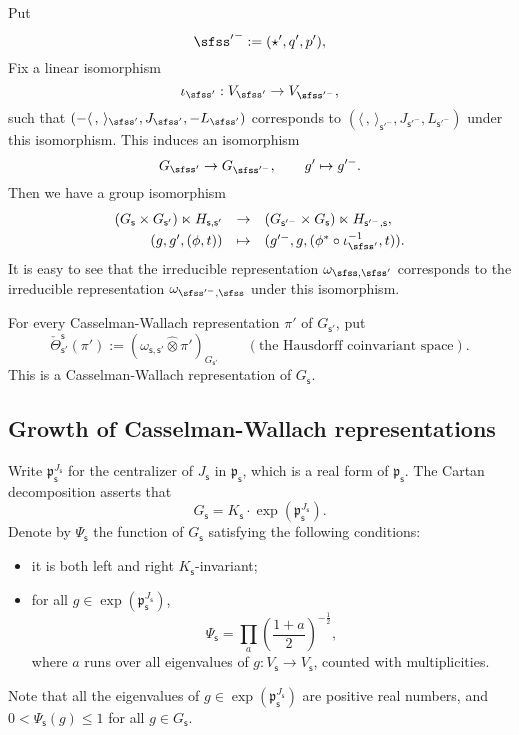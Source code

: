 \documentclass[12pt,a4paper]{amsart}
\newcommand{\p}{\mathfrak p}
\newcommand{\la}{\langle}
\newcommand{\ra}{\rangle}
\newcommand{\be}{\begin {equation}}
\newcommand{\ee}{\end {equation}}
\numberwithin{equation}{section}
\theoremstyle{remark}
\begin{document}
Put
\[%
   {\sfss'}^-:=(\star', q', p'),
\]
Fix a linear isomorphism
\be\label{iota0}
 \iota_{\sfss'}:  V_{\sfss'}\rightarrow V_{\sfss'^-}, %
\ee
such that $(-\la\,,\,\ra_{\sfss'}, J_{\sfss'},-L_{\sfss'})$ corresponds to   $(\la\,,\,\ra_{\mathsf s'^-}, J_{\mathsf s'^-}, L_{\mathsf s'^-})$ under this isomorphism.
This induces an isomorphism
\be\label{isoggp}
  G_{\sfss'}\rightarrow G_{\sfss'^-}, \qquad g'\mapsto g'^-.
\ee
Then we have a group isomorphism
\be\label{identifyjg}
\begin{array}{rcl}
  (G_{\mathsf s}\times G_{\mathsf s'})\ltimes H_{\mathsf s, \mathsf s'}&\rightarrow& (G_{\mathsf s'^-}\times G_{\mathsf s})\ltimes H_{\mathsf s'^-, \mathsf s},\smallskip\\
   (g, g', (\phi, t))&\mapsto & (g'^-, g, (\phi^*  \circ \iota_{\sfss'}^{-1}, t)).
   \end{array}
\ee
It is easy to see that the irreducible representation $\omega_{\sfss, \sfss'}$ corresponds to the irreducible representation $\omega_{\sfss'^-, \sfss}$ under this isomorphism.


 For every Casselman-Wallach representation $\pi'$ of $G_{\mathsf s'}$,
put
\[
   \check \Theta_{\mathsf s'}^{\mathsf s}(\pi'):=(\omega_{\mathsf s, \mathsf s'}\widehat \otimes \pi')_{G_{\mathsf s'}} \qquad (\textrm{the  Hausdorff coinvariant space}).
\]
This is a Casselman-Wallach representation of $G_{\mathsf s}$.



\subsection{Growth of Casselman-Wallach representations}

Write $\p_\mathsf s^{J_\mathsf s}$ for the centralizer of $J_\mathsf s$ in $\p_\mathsf s$, which is a real form of $\p_\mathsf s$. The Cartan decomposition asserts that
\[
  G_\mathsf s=K_\mathsf s\cdot \exp(\p_\mathsf s^{J_\mathsf s}).
\]
Denote by  $\Psi_\mathsf s$ the function of $G_\mathsf s$ satisfying the following conditions:
\begin{itemize}
\item it is both left and right $K_\mathsf s$-invariant;
\item for all $g\in \exp(\p_\mathsf s^{J_\mathsf s})$,
\[
  \Psi_\mathsf s=\prod_{a} \left(\frac{1+a}{2}\right)^{-\frac{1}{2}},
\]
 where $a$ runs over all eigenvalues of $g: V_\mathsf s\rightarrow V_\mathsf s$, counted with multiplicities.
\end{itemize}
Note that all the  eigenvalues of $g \in \exp(\p_\mathsf s^{J_\mathsf s})$ are positive real numbers, and  $0<\Psi_\mathsf s(g)\leq 1$ for all $g\in G_\mathsf s$.
\end{document}
